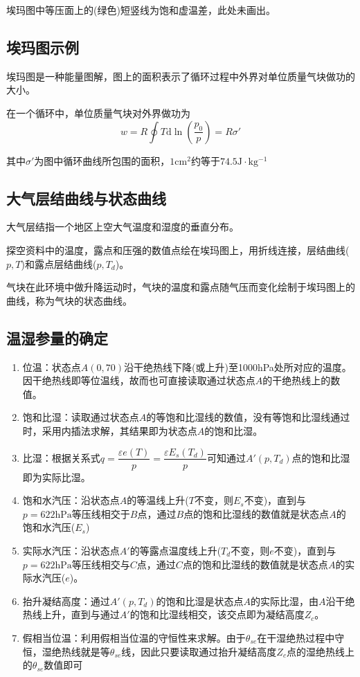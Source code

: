 \documentclass[UTF8,a4paper,11pt,oneside]{ctexbook}
\begin{document}
埃玛图中等压面上的(绿色)短竖线为饱和虚温差，此处未画出。

\subsection{埃玛图示例}

埃玛图是一种能量图解，图上的面积表示了循环过程中外界对单位质量气块做功的大小。

在一个循环中，单位质量气块对外界做功为
\begin{equation}
w=R\oint{}T\mathrm{d}\ln(\dfrac{p_0}{p})=R\sigma'
\end{equation}

其中\(\sigma'\)为图中循环曲线所包围的面积，\(1\mathrm{cm}^2\)约等于\(74.5\mathrm{J\cdot{}kg^{-1}}\)

\subsection{大气层结曲线与状态曲线}

大气层结指一个地区上空大气温度和湿度的垂直分布。

探空资料中的温度，露点和压强的数值点绘在埃玛图上，用折线连接，层结曲线(\(p,T\))和露点层结曲线(\(p,T_d\))。

气块在此环境中做升降运动时，气块的温度和露点随气压而变化绘制于埃玛图上的曲线，称为气块的状态曲线。

\subsection{温湿参量的确定}
\begin{enumerate}
    \item 位温：状态点\(A(0,70)\)沿干绝热线下降(或上升)至1000hPa处所对应的温度。因干绝热线即等位温线，故而也可直接读取通过状态点\(A\)的干绝热线上的数值。
    \item 饱和比湿：读取通过状态点\(A\)的等饱和比湿线的数值，没有等饱和比湿线通过时，采用内插法求解，其结果即为状态点\(A\)的饱和比湿。
    \item 比湿：根据关系式\(q=\dfrac{\varepsilon{}e(T)}{p}=\dfrac{\varepsilon{}E_s(T_d)}{p}\)可知通过\(A'(p,T_d)\)点的饱和比湿即为实际比湿。
    \item 饱和水汽压：沿状态点\(A\)的等温线上升(\(T\)不变，则\(E_s\)不变)，直到与\(p=622\mathrm{hPa}\)等压线相交于\(B\)点，通过\(B\)点的饱和比湿线的数值就是状态点\(A\)的饱和水汽压(\(E_s\))
    \item 实际水汽压：沿状态点\(A'\)的等露点温度线上升(\(T_d\)不变，则\(e\)不变)，直到与\(p=622\mathrm{hPa}\)等压线相交与\(C\)点，通过\(C\)点的饱和比湿线的数值就是状态点\(A\)的实际水汽压(\(e\))。
    \item 抬升凝结高度：通过\(A'(p,T_d)\)的饱和比湿是状态点\(A\)的实际比湿，由\(A\)沿干绝热线上升，直到与通过\(A'\)的饱和比湿线相交，该交点即为凝结高度\(Z_c\)。
    \item 假相当位温：利用假相当位温的守恒性来求解。由于\(\theta{}_{se}\)在干湿绝热过程中守恒，湿绝热线就是等\(\theta{}_{se}\)线，因此只要读取通过抬升凝结高度\(Z_c\)点的湿绝热线上的\(\theta{}_{se}\)数值即可
\end{enumerate}
\end{document}
